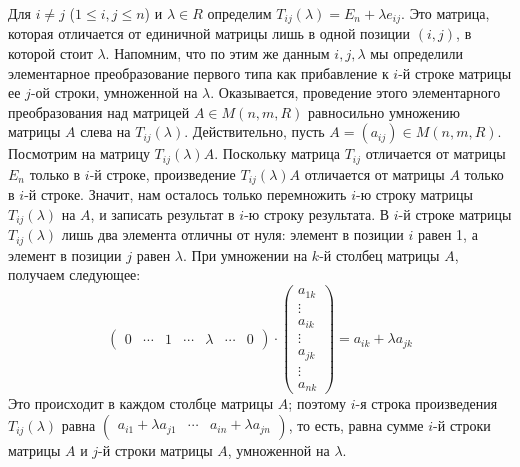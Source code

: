 Для $i\neq j$ ($1\leq i,j\leq n$) и $\lambda\in R$ определим
$T_{ij}(\lambda) = E_n + \lambda e_{ij}$. Это матрица, которая
отличается от единичной матрицы лишь в одной позиции $(i,j)$, в
которой стоит $\lambda$.
Напомним, что по этим же данным $i,j,\lambda$ мы определили
элементарное преобразование первого типа как прибавление к $i$-й
строке матрицы ее $j$-ой строки, умноженной на $\lambda$. Оказывается,
проведение этого элементарного преобразования над матрицей $A\in
M(n,m,R)$ равносильно умножению матрицы $A$ слева на
$T_{ij}(\lambda)$.
Действительно, пусть $A=(a_{ij})\in M(n,m,R)$. Посмотрим на матрицу
$T_{ij}(\lambda)A$. Поскольку матрица $T_{ij}$ отличается от матрицы
$E_n$ только в $i$-й строке, произведение $T_{ij}(\lambda)A$
отличается от матрицы $A$ только в $i$-й строке. Значит, нам осталось
только перемножить $i$-ю строку матрицы $T_{ij}(\lambda)$ на $A$, и
записать результат в $i$-ю строку результата. В $i$-й строке матрицы
$T_{ij}(\lambda)$ лишь два элемента отличны от нуля: элемент в позиции
$i$ равен 1, а элемент в позиции $j$ равен $\lambda$. При умножении на
$k$-й столбец матрицы $A$, получаем следующее:
$$
\left(\begin{matrix}0 & \cdots & 1 & \cdots & \lambda & \cdots & 0\end{matrix}\right)\cdot
\left(\begin{matrix} a_{1k} \\ \vdots \\ a_{ik} \\ \vdots \\ a_{jk} \\
  \vdots \\ a_{nk}\end{matrix}\right) = a_{ik} + \lambda a_{jk}
$$
Это происходит в каждом столбце матрицы $A$; поэтому $i$-я строка
произведения $T_{ij}(\lambda)$ равна $(\begin{matrix}a_{i1}+\lambda
  a_{j1} & \cdots & a_{in}+\lambda a_{jn}\end{matrix})$, то есть,
равна сумме $i$-й строки матрицы $A$ и $j$-й строки матрицы $A$,
умноженной на $\lambda$.

